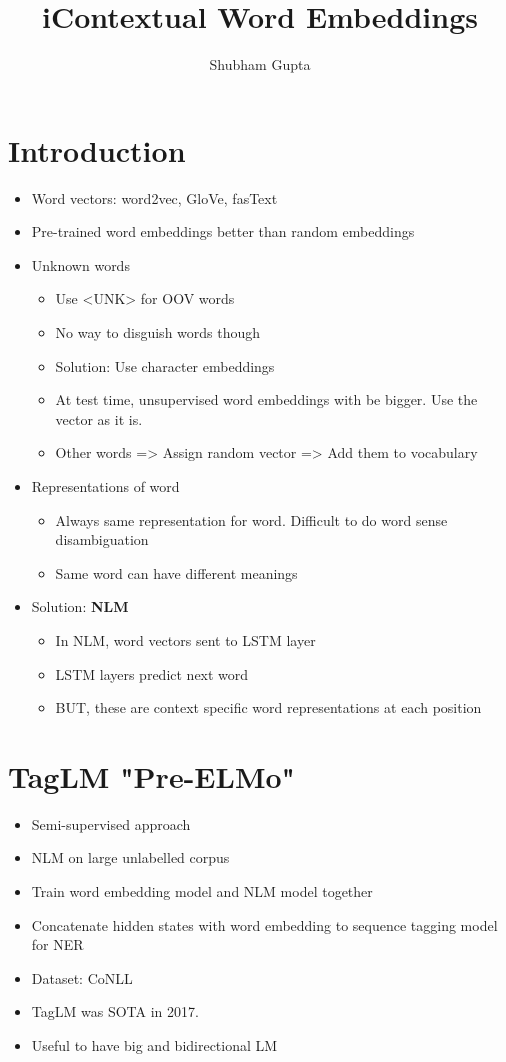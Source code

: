 \documentclass[a4paper]{article}
\title{iContextual Word Embeddings}
\author{Shubham Gupta}
\begin{document}
\maketitle
\section{Introduction}
\begin{itemize}
    \item Word vectors: word2vec, GloVe, fasText
    \item Pre-trained word embeddings better than random embeddings
    \item Unknown words
        \begin{itemize}
            \item Use <UNK> for OOV words
            \item No way to disguish words though
            \item Solution: Use character embeddings
            \item At test time, unsupervised word embeddings with be bigger. Use the vector as it is.
            \item Other words => Assign random vector => Add them to vocabulary
        \end{itemize}
    \item Representations of word
        \begin{itemize}
            \item Always same representation for word. Difficult to do word sense disambiguation
            \item Same word can have different meanings
        \end{itemize}
    \item Solution: \textbf{NLM}
        \begin{itemize}
            \item In NLM, word vectors sent to LSTM layer
            \item LSTM layers predict next word
            \item BUT, these are context specific word representations at each position
        \end{itemize}
\end{itemize}
\section{TagLM "Pre-ELMo"}
\begin{itemize}
    \item Semi-supervised approach
    \item NLM on large unlabelled corpus
    \item Train word embedding model and NLM model together
    \item Concatenate hidden states with word embedding to sequence tagging model for NER
    \item Dataset: CoNLL
    \item TagLM was SOTA in 2017.
    \item Useful to have big and bidirectional LM
\end{itemize}
\end{document}
